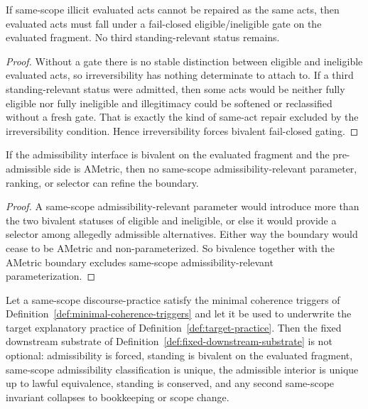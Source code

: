 \begin{lemma}
\label{lem:irrev-forces-bivalent-gating}
If same-scope illicit evaluated acts cannot be repaired as the same acts, then evaluated acts must fall
under a fail-closed eligible/ineligible gate on the evaluated fragment. No third standing-relevant
status remains.
\end{lemma}

\begin{proof}
Without a gate there is no stable distinction between eligible and ineligible evaluated acts, so
irreversibility has nothing determinate to attach to. If a third standing-relevant status were admitted,
then some acts would be neither fully eligible nor fully ineligible and illegitimacy could be softened or
reclassified without a fresh gate. That is exactly the kind of same-act repair excluded by the
irreversibility condition. Hence irreversibility forces bivalent fail-closed gating.
\end{proof}

\begin{lemma}
\label{lem:bivalence-boundary-excludes-parameterization}
If the admissibility interface is bivalent on the evaluated fragment and the pre-admissible side is
AMetric, then no same-scope admissibility-relevant parameter, ranking, or selector can refine the
boundary.
\end{lemma}

\begin{proof}
A same-scope admissibility-relevant parameter would introduce more than the two bivalent statuses of
eligible and ineligible, or else it would provide a selector among allegedly admissible alternatives.
Either way the boundary would cease to be AMetric and non-parameterized. So bivalence together
with the AMetric boundary excludes same-scope admissibility-relevant parameterization.
\end{proof}

\begin{theorem}
\label{thm:compressed-substrate-necessity}
Let a same-scope discourse-practice satisfy the minimal coherence triggers of
Definition~\ref{def:minimal-coherence-triggers} and let it be used to underwrite the target
explanatory practice of Definition~\ref{def:target-practice}. Then the fixed downstream substrate of
Definition~\ref{def:fixed-downstream-substrate} is not optional: admissibility is forced, standing is
bivalent on the evaluated fragment, same-scope admissibility classification is unique, the admissible
interior is unique up to lawful equivalence, standing is conserved, and any second same-scope
invariant collapses to bookkeeping or scope change.
\end{theorem}

